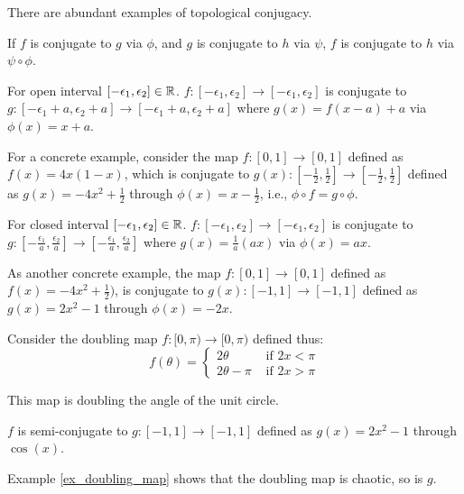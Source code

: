 There are abundant examples of topological conjugacy.

\begin{example}
	If $f$ is conjugate to $g$ via $\phi$, and $g$ is conjugate to $h$ via $\psi$, $f$ is conjugate to $h$ via $\psi \circ \phi$.
	\begin{center}
	\end{center}
\end{example}

\begin{example}
	For open interval $[-\epsilon_1, \epsilon_2] \in \mathbb{R}$. 
	$f: [-\epsilon_1, \epsilon_2] \rightarrow [-\epsilon_1, \epsilon_2]$
	is conjugate to 
	$g: [-\epsilon_1 + a, \epsilon_2 + a] \rightarrow  [-\epsilon_1 + a, \epsilon_2 + a]$
	where $g(x)= f(x -a) + a$ via $\phi(x) = x + a$.

	For a concrete example, consider the map 
	$f: [0,1] \rightarrow [0,1]$
	defined as $f(x) = 4x(1-x)$,
	which is conjugate to 
	$g(x): [-\frac{1}{2}, \frac{1}{2}] \rightarrow [-\frac{1}{2}, \frac{1}{2}]$
	defined as $g(x) = -4x^2 + \frac{1}{2}$ 
	through $\phi(x) = x -\frac{1}{2}$, i.e., $ \phi \circ f=  g \circ \phi$.
\end{example}

\begin{example}
	For closed interval $[-\epsilon_1, \epsilon_2] \in \mathbb{R}$. 
	$f: [-\epsilon_1, \epsilon_2] \rightarrow [-\epsilon_1, \epsilon_2]$
	is conjugate to 
	$g: [-\frac{\epsilon_1}{a}, \frac{\epsilon_2}{a}] \rightarrow [-\frac{\epsilon_1}{a}, \frac{\epsilon_2}{a}]$
	where $g(x)= \frac{1}{a}(ax)$ via $\phi(x) = ax$.


	As another concrete example, the map $f: [0,1] \rightarrow [0,1]$
	defined as $f(x) = -4x^2 + \frac{1}{2})$,
	is conjugate to 
	$g(x): [-1, 1] \rightarrow [-1, 1]$
	defined as $g(x) = 2x^2 - 1$
	through $\phi(x) = -2x$.
\end{example}

\begin{example}
	Consider the doubling map $f: [0,\pi) \rightarrow [0, \pi)$ defined thus: 
	$$
	f(\theta) = 
		\begin{cases}
			2 \theta &\text{ if } 2x <  \pi \\
			2 \theta - \pi &\text{ if } 2x > \pi
		\end{cases}
	$$
	
	This map is doubling the angle of the unit circle.

	$f$ is semi-conjugate to $g: [-1, 1] \rightarrow [-1, 1]$ defined as $g(x) = 2x^2 - 1$ through $\cos(x)$.

	Example \ref{ex_doubling_map} shows that the doubling map is chaotic, so is $g$.
\end{example}

